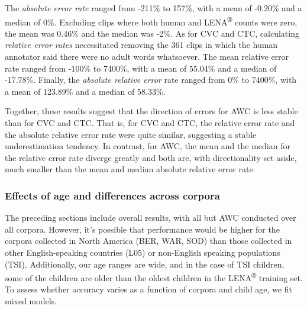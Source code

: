 \documentclass[english,table,man,floatsintext]{apa6}
\begin{document}
The \emph{absolute error rate} ranged from -211\% to 157\%, with a mean of -0.20\% and a median of 0\%. Excluding clips where both human and LENA\textsuperscript{®} counts were zero,
the mean was 0.46\% and the median was -2\%. As for CVC and CTC, calculating \emph{relative error rates} necessitated removing the 361 clips in which the human annotator said there were no adult words whatsoever. The mean relative error rate ranged from -100\% to 7400\%, with a mean of 55.04\% and a median of -17.78\%. Finally, the \emph{absolute relative error} rate ranged from 0\% to 7400\%, with a mean of 123.89\% and a median of 58.33\%.

Together, these results suggest that the direction of errors for AWC is less stable than for CVC and CTC. That is, for CVC and CTC, the relative error rate and the absolute relative error rate were quite similar, suggesting a stable underestimation tendency. In contrast, for AWC, the mean and the median for the relative error rate diverge greatly and both are, with directionality set aside, much smaller than the mean and median absolute relative error rate.

\hypertarget{effects-of-age-and-differences-across-corpora}{%
\subsubsection{Effects of age and differences across corpora}\label{effects-of-age-and-differences-across-corpora}}

The preceding sections include overall results, with all but AWC conducted over all corpora. However, it's possible that performance would be higher for the corpora collected in North America (BER, WAR, SOD) than those collected in other English-speaking countries (L05) or non-English speaking populations (TSI). Additionally, our age ranges are wide, and in the case of TSI children, some of the children are older than the oldest children in the LENA\textsuperscript{®} training set. To assess whether accuracy varies as a function of corpora and child age, we fit mixed models.
\end{document}
